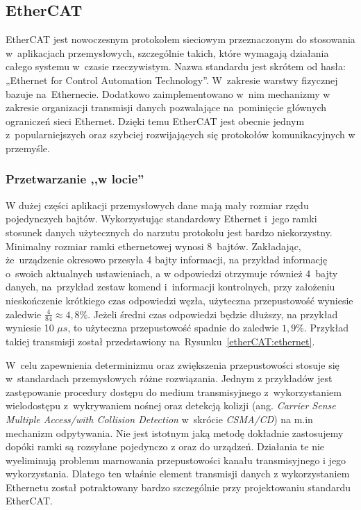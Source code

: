 \subsection{EtherCAT}

EtherCAT jest nowoczesnym protokołem sieciowym przeznaczonym do stosowania w~aplikacjach przemysłowych, szczególnie takich, które wymagają działania całego systemu w~czasie rzeczywistym. Nazwa standardu jest skrótem od hasła: „Ethernet for Control Automation Technology”. W~zakresie warstwy fizycznej bazuje na~Ethernecie. Dodatkowo zaimplementowano w~nim mechanizmy w zakresie organizacji transmisji danych pozwalające na~pominięcie głównych ograniczeń sieci Ethernet. Dzięki temu EtherCAT jest obecnie jednym z~popularniejszych oraz szybciej rozwijających się protokołów komunikacyjnych w przemyśle.

\subsubsection{Przetwarzanie ,,w locie''}
W dużej części aplikacji przemysłowych dane mają mały rozmiar rzędu pojedynczych bajtów. Wykorzystując standardowy Ethernet i~jego ramki stosunek danych użytecznych do narzutu protokołu jest bardzo niekorzystny. 
Minimalny rozmiar ramki ethernetowej wynosi 8~bajtów. Zakładając, że~urządzenie okresowo przesyła 4 bajty informacji, na przykład informację o~swoich aktualnych ustawieniach, a w odpowiedzi otrzymuje również 4~bajty danych, na~przykład zestaw komend i~informacji kontrolnych, przy założeniu nieskończenie krótkiego czas odpowiedzi węzła, użyteczna przepustowość wyniesie zaledwie $\frac{4}{84}\approx4,8\%$. Jeżeli średni czas odpowiedzi będzie dłuższy, na przykład wyniesie 10 $\mu s$, to użyteczna przepustowość spadnie do zaledwie $1,9\%$. Przykład takiej transmisji został przedstawiony na~Rysunku~\ref{etherCAT:ethernet}.

\vspace{-3mm}

W~celu zapewnienia determinizmu oraz zwiększenia przepustowości stosuje się w~standardach przemysłowych różne rozwiązania. Jednym z przykładów jest zastępowanie procedury dostępu do medium transmisyjnego z~wykorzystaniem wielodostępu z~wykrywaniem nośnej oraz detekcją kolizji (ang. \textit{Carrier Sense Multiple Access/with Collision Detection} w~skrócie \textit{CSMA/CD}) na m.in mechanizm odpytywania.
Nie jest istotnym jaką metodę dokładnie zastosujemy dopóki ramki są rozsyłane pojedynczo z oraz do urządzeń. Działania te nie wyeliminują problemu marnowania przepustowości kanału transmisyjnego i jego wykorzystania. Dlatego ten właśnie element transmisji danych z wykorzystaniem Ethernetu został potraktowany bardzo szczególnie przy projektowaniu standardu EtherCAT.

